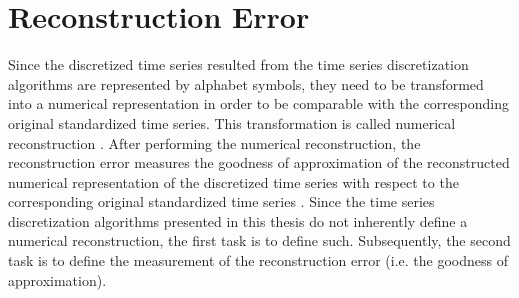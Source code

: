 \section{Reconstruction Error}
Since the discretized time series resulted from the time series discretization algorithms are represented by alphabet symbols, they need to be transformed into a numerical representation in order to be comparable with the corresponding original standardized time series. This transformation is called numerical reconstruction \cite{APCA}. After performing the numerical reconstruction, the reconstruction error measures the goodness of approximation of the reconstructed numerical representation of the discretized time series with respect to the corresponding original standardized time series \cite{APCA}. Since the time series discretization algorithms presented in this thesis do not inherently define a numerical reconstruction, the first task is to define such. Subsequently, the second task is to define the measurement of the reconstruction error (i.e. the goodness of approximation).
